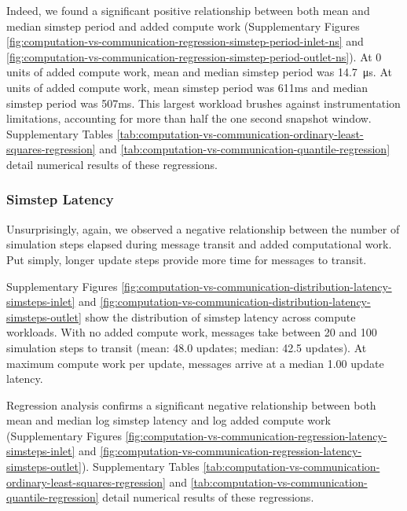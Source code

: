 Indeed, we found a significant positive relationship between both mean and median simstep period and added compute work (Supplementary Figures \ref{fig:computation-vs-communication-regression-simstep-period-inlet-ns} and \ref{fig:computation-vs-communication-regression-simstep-period-outlet-ns}).
At 0 units of added compute work, mean and median simstep period was \SI{14.7}{\micro\second}.
At  units of added compute work, mean simstep period was 611ms and median simstep period was 507ms.
This largest workload brushes against instrumentation limitations, accounting for more than half the one second snapshot window.
Supplementary Tables \ref{tab:computation-vs-communication-ordinary-least-squares-regression} and \ref{tab:computation-vs-communication-quantile-regression} detail numerical results of these regressions.

\subsubsection{Simstep Latency}

Unsurprisingly, again, we observed a negative relationship between the number of simulation steps elapsed during message transit and added computational work.
Put simply, longer update steps provide more time for messages to transit.

Supplementary Figures \ref{fig:computation-vs-communication-distribution-latency-simsteps-inlet} and \ref{fig:computation-vs-communication-distribution-latency-simsteps-outlet} show the distribution of simstep latency across compute workloads.
With no added compute work, messages take between 20 and 100 simulation steps to transit (mean: 48.0 updates; median: 42.5 updates).
At maximum compute work per update, messages arrive at a median 1.00 update latency.

Regression analysis confirms a significant negative relationship between both mean and median log simstep latency and log added compute work (Supplementary Figures \ref{fig:computation-vs-communication-regression-latency-simsteps-inlet} and \ref{fig:computation-vs-communication-regression-latency-simsteps-outlet}).
Supplementary Tables \ref{tab:computation-vs-communication-ordinary-least-squares-regression} and \ref{tab:computation-vs-communication-quantile-regression} detail numerical results of these regressions.

